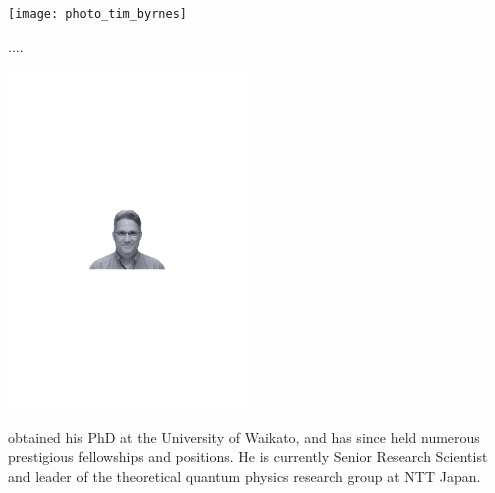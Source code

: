
%
%

\begin{center}
\texttt{[image: photo\_tim\_byrnes]}
\end{center}

....


%
%

\begin{center}
\includegraphics[clip=true, width=0.475\textwidth]{photo_bill_munro}
\end{center}

 obtained his PhD at the University of Waikato, and has since held numerous prestigious fellowships and positions. He is currently Senior Research Scientist and leader of the theoretical quantum physics research group at NTT Japan.


